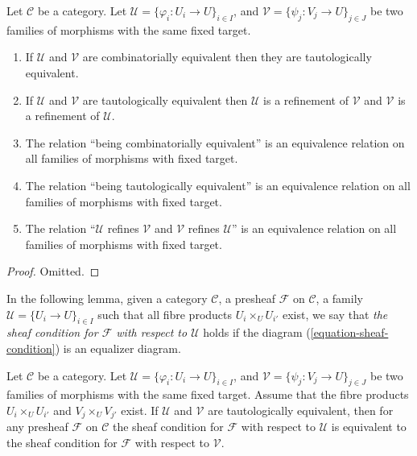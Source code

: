\begin{lemma}
\label{lemma-tautological-combinatorial}
Let $\mathcal{C}$ be a category.
Let $\mathcal{U} = \{\varphi_i : U_i \to U\}_{i\in I}$, and
$\mathcal{V} = \{\psi_j : V_j \to U\}_{j\in J}$ be two families of morphisms
with the same fixed target.
\begin{enumerate}
\item If $\mathcal{U}$ and $\mathcal{V}$ are combinatorially equivalent
then they are tautologically equivalent.
\item If $\mathcal{U}$ and $\mathcal{V}$ are tautologically equivalent
then $\mathcal{U}$ is a refinement of $\mathcal{V}$ and
$\mathcal{V}$ is a refinement of $\mathcal{U}$.
\item The relation ``being combinatorially equivalent'' is an
equivalence relation on all families of morphisms with fixed target.
\item The relation ``being tautologically equivalent'' is an
equivalence relation on all families of morphisms with fixed target.
\item The relation ``$\mathcal{U}$ refines $\mathcal{V}$ and
$\mathcal{V}$ refines $\mathcal{U}$'' is an equivalence relation on
all families of morphisms with fixed target.
\end{enumerate}
\end{lemma}

\begin{proof}
Omitted.
\end{proof}

\noindent
In the following lemma, given a category $\mathcal{C}$, a presheaf
$\mathcal{F}$  on $\mathcal{C}$, a
family $\mathcal{U} = \{U_i \to U\}_{i\in I}$ such that
all fibre products $U_i \times_U U_{i'}$ exist, we say that
{\it the sheaf condition for $\mathcal{F}$ with respect to
$\mathcal{U}$} holds if the diagram (\ref{equation-sheaf-condition})
is an equalizer diagram.

\begin{lemma}
\label{lemma-tautological-same-sheaf}
Let $\mathcal{C}$ be a category. Let
$\mathcal{U} = \{\varphi_i : U_i \to U\}_{i\in I}$, and
$\mathcal{V} = \{\psi_j : V_j \to U\}_{j\in J}$ be two families of morphisms
with the same fixed target. Assume that the fibre products
$U_i \times_U U_{i'}$ and $V_j \times_U V_{j'}$ exist.
If $\mathcal{U}$ and $\mathcal{V}$ are
tautologically equivalent, then for any presheaf $\mathcal{F}$ on
$\mathcal{C}$ the sheaf condition for $\mathcal{F}$ with respect to
$\mathcal{U}$ is equivalent to the sheaf condition for $\mathcal{F}$
with respect to $\mathcal{V}$.
\end{lemma}

